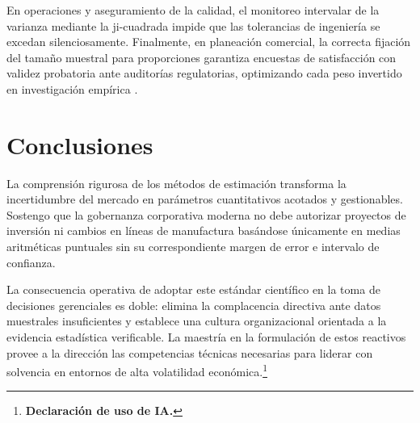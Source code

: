 {En operaciones y aseguramiento de la calidad, el monitoreo intervalar de la varianza mediante la ji-cuadrada impide que las tolerancias de ingeniería se excedan silenciosamente. Finalmente, en planeación comercial, la correcta fijación del tamaño muestral para proporciones garantiza encuestas de satisfacción con validez probatoria ante auditorías regulatorias, optimizando cada peso invertido en investigación empírica \citep{holmesBusiness2023,nistHandbook}.

\section{Conclusiones}
La comprensión rigurosa de los métodos de estimación transforma la incertidumbre del mercado en parámetros cuantitativos acotados y gestionables. Sostengo que la gobernanza corporativa moderna no debe autorizar proyectos de inversión ni cambios en líneas de manufactura basándose únicamente en medias aritméticas puntuales sin su correspondiente margen de error e intervalo de confianza. 

La consecuencia operativa de adoptar este estándar científico en la toma de decisiones gerenciales es doble: elimina la complacencia directiva ante datos muestrales insuficientes y establece una cultura organizacional orientada a la evidencia estadística verificable. La maestría en la formulación de estos reactivos provee a la dirección las competencias técnicas necesarias para liderar con solvencia en entornos de alta volatilidad económica.\footnote{\textbf{Declaración de uso de IA.} \estadisticadeclaracionia}
}

